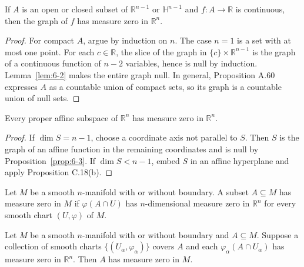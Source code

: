 \begin{proposition}
\label{prop:6-3}





If $A$ is an open or closed subset of $\mathbb{R}^{n-1}$ or $\mathbb{H}^{n-1}$ and $f:A\to\mathbb{R}$ is continuous, then the graph of $f$ has measure zero in $\mathbb{R}^n$.
\end{proposition}

\begin{proof}

\sketch For compact $A$, argue by induction on $n$. The case $n=1$ is a set with at most one point. For each $c\in\mathbb{R}$, the slice of the graph in $\{c\}\times\mathbb{R}^{n-1}$ is the graph of a continuous function of $n-2$ variables, hence is null by induction. Lemma~\ref{lem:6-2} makes the entire graph null. In general, Proposition A.60 expresses $A$ as a countable union of compact sets, so its graph is a countable union of null sets.
\end{proof}

\begin{corollary}
\label{cor:6-4}





Every proper affine subspace of $\mathbb{R}^n$ has measure zero in $\mathbb{R}^n$.
\end{corollary}

\begin{proof}

\sketch If $\dim S=n-1$, choose a coordinate axis not parallel to $S$. Then $S$ is the graph of an affine function in the remaining coordinates and is null by Proposition~\ref{prop:6-3}. If $\dim S<n-1$, embed $S$ in an affine hyperplane and apply Proposition C.18(b).
\end{proof}

\begin{definition}
\label{def:6-38-extra-2}




Let $M$ be a smooth $n$-manifold with or without boundary. A subset $A\subseteq M$ has measure zero in $M$ if $\varphi(A\cap U)$ has $n$-dimensional measure zero in $\mathbb{R}^n$ for every smooth chart $(U,\varphi)$ of $M$.
\end{definition}

\begin{lemma}
\label{lem:6-6}




Let $M$ be a smooth $n$-manifold with or without boundary and $A\subseteq M$. Suppose a collection of smooth charts $\{(U_\alpha,\varphi_\alpha)\}$ covers $A$ and each $\varphi_\alpha(A\cap U_\alpha)$ has measure zero in $\mathbb{R}^n$. Then $A$ has measure zero in $M$.
\end{lemma}

